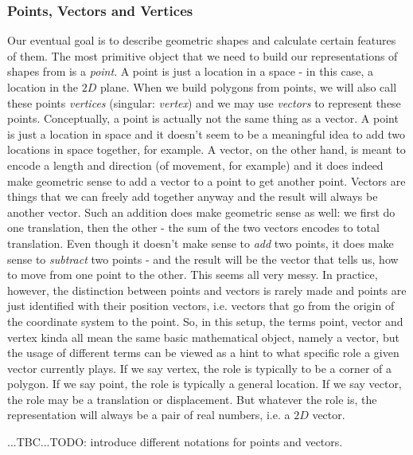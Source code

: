 \subsubsection{Points, Vectors and Vertices}
Our eventual goal is to describe geometric shapes and calculate certain features of them. The most primitive object that we need to build our representations of shapes from is a \emph{point}. A point is just a location in a space - in this case, a location in the $2D$ plane. When we build polygons from points, we will also call these points \emph{vertices} (singular: \emph{vertex}) and we may use \emph{vectors} to represent these points. Conceptually, a point is actually not the same thing as a vector. A point is just a location in space and it doesn't seem to be a meaningful idea to add two locations in space together, for example. A vector, on the other hand, is meant to encode a length and direction (of movement, for example) and it does indeed make geometric sense to add a vector to a point to get another point. Vectors are things that we can freely add together anyway and the result will always be another vector. Such an addition does make geometric sense as well: we first do one translation, then the other - the sum of the two vectors encodes to total translation. Even though it doesn't make sense to \emph{add} two points, it does make sense to \emph{subtract} two points - and the result will be the vector that tells us, how to move from one point to the other. This seems all very messy. In practice, however, the distinction between points and vectors is rarely made and points are just identified with their position vectors, i.e. vectors that go from the origin of the coordinate system to the point. So, in this setup, the terms point, vector and vertex kinda all mean the same basic mathematical object, namely a vector, but the usage of different terms can be viewed as a hint to what specific role a given vector currently plays. If we say vertex, the role is typically to be a corner of a polygon. If we say point, the role is typically a general location. If we say vector, the role may be a translation or displacement. But whatever the role is, the representation will always be a pair of real numbers, i.e. a $2D$ vector.

...TBC...TODO: introduce different notations for points and vectors.


